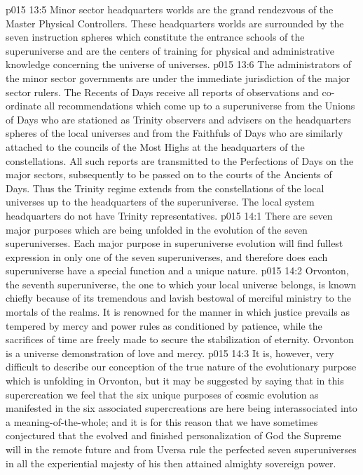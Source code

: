\vs p015 13:5 Minor sector headquarters worlds are the grand rendezvous of the Master Physical Controllers. These headquarters worlds are surrounded by the seven instruction spheres which constitute the entrance schools of the superuniverse and are the centers of training for physical and administrative knowledge concerning the universe of universes.
\vs p015 13:6 The administrators of the minor sector governments are under the immediate jurisdiction of the major sector rulers. The Recents of Days receive all reports of observations and co\hyp{}ordinate all recommendations which come up to a superuniverse from the Unions of Days who are stationed as Trinity observers and advisers on the headquarters spheres of the local universes and from the Faithfuls of Days who are similarly attached to the councils of the Most Highs at the headquarters of the constellations. All such reports are transmitted to the Perfections of Days on the major sectors, subsequently to be passed on to the courts of the Ancients of Days. Thus the Trinity regime extends from the constellations of the local universes up to the headquarters of the superuniverse. The local system headquarters do not have Trinity representatives.
\vs p015 14:1 There are seven major purposes which are being unfolded in the evolution of the seven superuniverses. Each major purpose in superuniverse evolution will find fullest expression in only one of the seven superuniverses, and therefore does each superuniverse have a special function and a unique nature.
\vs p015 14:2 Orvonton, the seventh superuniverse, the one to which your local universe belongs, is known chiefly because of its tremendous and lavish bestowal of merciful ministry to the mortals of the realms. It is renowned for the manner in which justice prevails as tempered by mercy and power rules as conditioned by patience, while the sacrifices of time are freely made to secure the stabilization of eternity. Orvonton is a universe demonstration of love and mercy.
\vs p015 14:3 It is, however, very difficult to describe our conception of the true nature of the evolutionary purpose which is unfolding in Orvonton, but it may be suggested by saying that in this supercreation we feel that the six unique purposes of cosmic evolution as manifested in the six associated supercreations are here being interassociated into a meaning\hyp{}of\hyp{}the\hyp{}whole; and it is for this reason that we have sometimes conjectured that the evolved and finished personalization of God the Supreme will in the remote future and from Uversa rule the perfected seven superuniverses in all the experiential majesty of his then attained almighty sovereign power.
